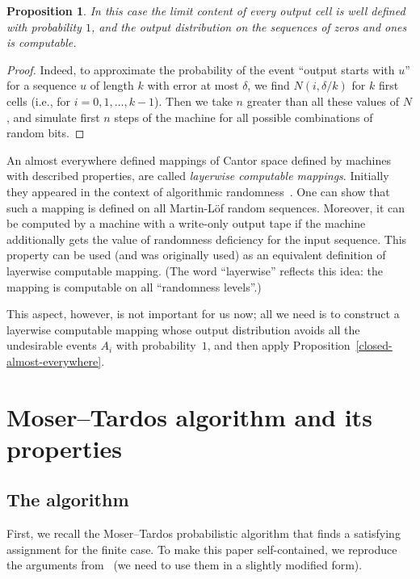\documentclass[12pt]{article}
\newtheorem{proposition}{Proposition}
\begin{document}
\begin{proposition}\label{output-layerwise}
 In this case the limit content of every output cell is well defined with probability $1$, and the output distribution on the sequences of zeros and ones is computable.
\end{proposition}

\begin{proof}
Indeed, to approximate the probability of the event ``output starts with $u$'' for a sequence $u$ of length $k$ with error at most $\delta$, we find $N(i,\delta/k)$ for $k$ first cells (i.e., for $i=0,1,\ldots, k-1$). Then we take $n$ greater than all these values of $N$, and simulate first $n$ steps of the machine for all possible combinations of random bits.
\end{proof}

An almost everywhere defined mappings of Cantor space defined by machines with described properties, are called \emph{layerwise computable mappings}. Initially they appeared in the context of algorithmic randomness~\cite{hoyrup-rojas}. One can show that such a mapping is defined on all Martin-L\"of random sequences. Moreover, it can be computed by a machine with a write-only output tape if the machine additionally gets the value of randomness deficiency for the input sequence. This property can be used (and was originally used) as an equivalent definition of layerwise computable mapping. (The word ``layerwise'' reflects this idea: the mapping is computable on all ``randomness levels''.)

This aspect, however, is not important for us now; all we need is to construct a layerwise computable mapping whose output distribution avoids all the undesirable events $A_i$ with probability~$1$, and then apply Proposition~\ref{closed-almost-everywhere}.

\section{Moser--Tardos algorithm and its properties}

\subsection{The algorithm}

First, we recall the Moser--Tardos probabilistic algorithm that finds a satisfying assignment for the finite case. To make this paper self-contained, we reproduce the arguments from~\cite{moser-tardos} (we need to use them in a slightly modified form).
\end{document}
